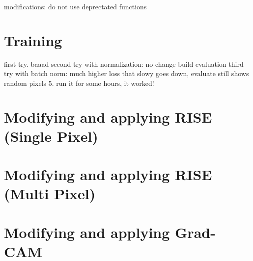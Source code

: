 modifications: do not use deprectated functions

\section{Training}

first try. baaad
second try with normalization: no change
build evaluation
third try with batch norm: much higher loss that slowy goes down, evaluate still shows random pixels
5. run it for some hours, it worked!

\section{Modifying and applying RISE (Single Pixel)}
\section{Modifying and applying RISE (Multi Pixel)}
\section{Modifying and applying Grad-CAM}
